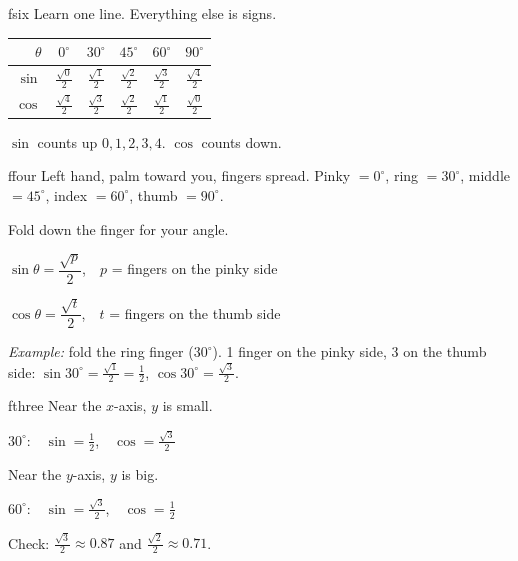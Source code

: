 \documentclass[11pt]{article}
\newcommand{\hrt}[1]{\tfrac{\sqrt{#1}}{2}}
\begin{document}
\begin{minipage}[t]{0.435\textwidth}
\vspace{0pt}
\begin{tip}[title={The square-root ladder}, before skip=0pt]{fsix}
Learn one line. Everything else is signs.\par\smallskip
\renewcommand{\arraystretch}{1.6}\setlength{\tabcolsep}{3.2pt}
\begin{tabular}{@{}r|ccccc@{}}
  $\theta$ & $0^\circ$ & $30^\circ$ & $45^\circ$ & $60^\circ$ & $90^\circ$ \\\hline
  $\sin$ & $\frac{\sqrt0}{2}$ & $\frac{\sqrt1}{2}$ & $\frac{\sqrt2}{2}$ & $\frac{\sqrt3}{2}$ & $\frac{\sqrt4}{2}$ \\
  $\cos$ & $\frac{\sqrt4}{2}$ & $\frac{\sqrt3}{2}$ & $\frac{\sqrt2}{2}$ & $\frac{\sqrt1}{2}$ & $\frac{\sqrt0}{2}$ \\
\end{tabular}\par\smallskip
\small $\sin$ counts up $0,1,2,3,4$. $\cos$ counts down.
\end{tip}

\begin{tip}[title={The hand trick}]{ffour}
\small Left hand, palm toward you, fingers spread.
Pinky $=0^\circ$, ring $=30^\circ$, middle $=45^\circ$, index $=60^\circ$, thumb $=90^\circ$.\par\smallskip
Fold down the finger for your angle.\par\smallskip
\quad$\sin\theta = \dfrac{\sqrt{p}}{2}$,\ \ $p$ = fingers on the pinky side\par\smallskip
\quad$\cos\theta = \dfrac{\sqrt{t}}{2}$,\ \ $t$ = fingers on the thumb side\par\smallskip
\emph{Example:} fold the ring finger ($30^\circ$). 1 finger on the pinky side, 3 on the thumb side:
$\sin30^\circ=\frac{\sqrt1}{2}=\frac12$, $\cos30^\circ=\frac{\sqrt3}{2}$.
\end{tip}

\begin{tip}[title={Big or small?}]{fthree}
\small Near the $x$-axis, $y$ is small.\par
\quad $30^\circ$:\ \ $\sin=\tfrac12$,\ \ $\cos=\hrt3$\par\smallskip
Near the $y$-axis, $y$ is big.\par
\quad $60^\circ$:\ \ $\sin=\hrt3$,\ \ $\cos=\tfrac12$\par\smallskip
Check: $\frac{\sqrt3}{2}\approx0.87$ and $\frac{\sqrt2}{2}\approx0.71$.
\end{tip}
\end{minipage}
\end{document}
